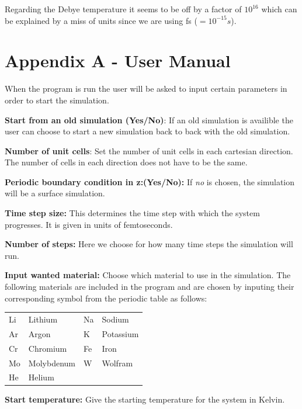 \documentclass[12pt,a4paper]{article}
\begin{document}
Regarding the Debye temperature it seems to be off by a factor of \(10^{16}\) which can be explained by a miss of units since we are using fs (\(= 10^{-15}s\)).

\newpage

\section{Appendix A - User Manual}

\label{sec:AppendixA}
When the program is run the user will be asked to input certain parameters in order to start the simulation.

\textbf{Start from an old simulation (Yes/No)}: If an old simulation is availible the user can choose to start a new simulation back to back with the old simulation.  

\textbf{Number of unit cells}: Set the number of unit cells in each cartesian direction. The number of cells in each direction does not have to be the same.

\textbf{Periodic boundary condition in z:(Yes/No):} 
If \emph{no} is chosen, the simulation will be a surface simulation.

\textbf{Time step size:} This determines the time step with which the system progresses. It is given in units of femtoseconds.

\textbf{Number of steps:} Here we choose for how many time steps the simulation will run.

\textbf{Input wanted material:} Choose which material to use in the simulation. The following materials are included in the program and are chosen by inputing their corresponding symbol from the periodic table as follows:

\begin{table}[h]
\begin{center}
\begin{tabular}{l l | l l}
Li & Lithium & Na & Sodium \\
Ar & Argon & K & Potassium \\
Cr & Chromium & Fe & Iron \\
Mo & Molybdenum & W & Wolfram \\
He & Helium & & \\
\end{tabular}
\end{center}
\end{table}


\textbf{Start temperature:} Give the starting temperature for the system in Kelvin.
\end{document}
